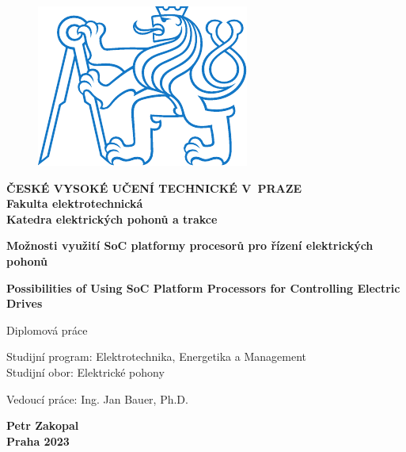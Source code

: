 \documentclass[a4paper, twoside, 11pt]{article}
\begin{document}
\setcounter{figure}{0}

\begin{titlepage}
	\begin{center}

\begin{figure}[H]
	\begin{center}
		\includegraphics[scale=1]{src/misc/symbol_cvut_konturova_verze.pdf}
	\end{center}
\end{figure}
	{\Large{\textbf{ČESKÉ VYSOKÉ UČENÍ TECHNICKÉ V~PRAZE}}}\\
	{\textbf{Fakulta elektrotechnická}}\\
	{\textbf{Katedra elektrických pohonů a trakce}}
	
	\vspace{3cm}
	
	
	{\Large\textbf{Možnosti využití SoC platformy procesorů pro řízení elektrických pohonů}}
	
	\vspace{1cm}
	
	{\Large\textbf{Possibilities of Using SoC Platform Processors for Controlling Electric Drives}}
	
	\vspace{2cm}
	
	Diplomová práce\\
	
	\end{center}
	
	\vspace{3cm}
	
	\noindent Studijní program: Elektrotechnika, Energetika a Management\\
	\noindent Studijní obor: Elektrické pohony
	
	\vspace{0.5cm}
	\noindent Vedoucí práce: Ing. Jan Bauer, Ph.D.
	
	\vfill
	
\begin{center}

	\large{\textbf{Petr Zakopal}}\\
	\large{\textbf{Praha 2023}}
	\end{center}
\end{titlepage}
\end{document}
